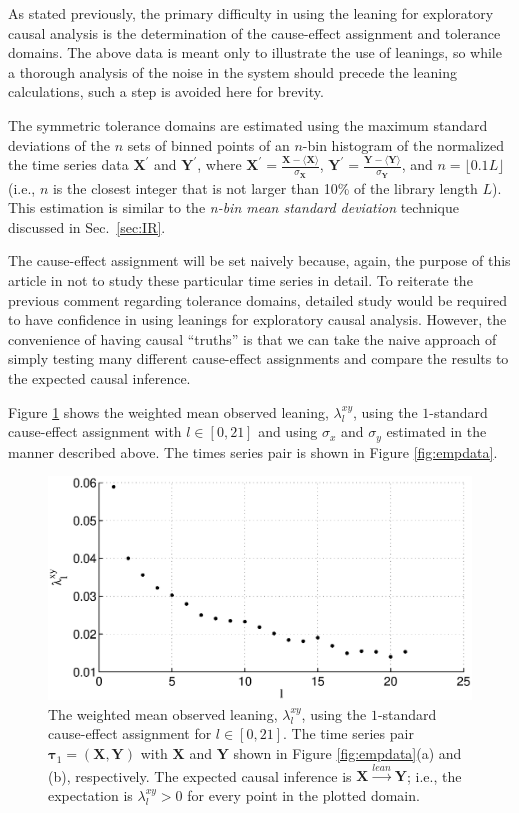 \documentclass[twocolumn,aps,pre,groupedaddress]{revtex4-1}
\begin{document}
As stated previously, the primary difficulty in using the leaning for exploratory causal analysis is the determination of the cause-effect assignment and tolerance domains.  The above data is meant only to illustrate the use of leanings, so while a thorough analysis of the noise in the system should precede the leaning calculations, such a step is avoided here for brevity.  

The symmetric tolerance domains are estimated using the maximum standard deviations of the $n$ sets of binned points of an $n$-bin histogram of the normalized the time series data $\mathbf{X}^\prime$ and $\mathbf{Y}^\prime$, where $\mathbf{X}^\prime = \frac{\mathbf{X}-\langle \mathbf{X} \rangle}{\sigma_\mathbf{X}}$, $\mathbf{Y}^\prime = \frac{\mathbf{Y}-\langle \mathbf{Y} \rangle}{\sigma_\mathbf{Y}}$, and $n=\lfloor 0.1L\rfloor$ (i.e., $n$ is the closest integer that is not larger than 10\% of the library length $L$).  This estimation is similar to the {\em n-bin mean standard deviation} technique discussed in Sec.\ \ref{sec:IR}.

The cause-effect assignment will be set naively because, again, the purpose of this article in not to study these particular time series in detail.  To reiterate the previous comment regarding tolerance domains, detailed study would be required to have confidence in using leanings for exploratory causal analysis.  However, the convenience of having causal ``truths'' is that we can take the naive approach of simply testing many different cause-effect assignments and compare the results to the expected causal inference.

Figure \ref{fig:emp} shows the weighted mean observed leaning, $\lambda_l^{xy}$, using the $1$-standard cause-effect assignment with $l\in[0,21]$ and using $\sigma_x$ and $\sigma_y$ estimated in the manner described above.  The times series pair is shown in Figure \ref{fig:empdata}.  
\begin{figure}
\includegraphics[scale=0.40]{EmpiricalData_p87leans.eps}
\caption{The weighted mean observed leaning, $\lambda_l^{xy}$, using the $1$-standard cause-effect assignment for $l\in[0,21]$.  The time series pair $\mathbf{\tau}_1 = (\mathbf{X},\mathbf{Y})$ with $\mathbf{X}$ and $\mathbf{Y}$ shown in Figure \ref{fig:empdata}(a) and (b), respectively.  The expected causal inference is $\mathbf{X}\xrightarrow{lean}\mathbf{Y}$; i.e., the expectation is $\lambda_l^{xy} > 0$ for every point in the plotted domain.}
\label{fig:emp}
\end{figure}
\end{document}
